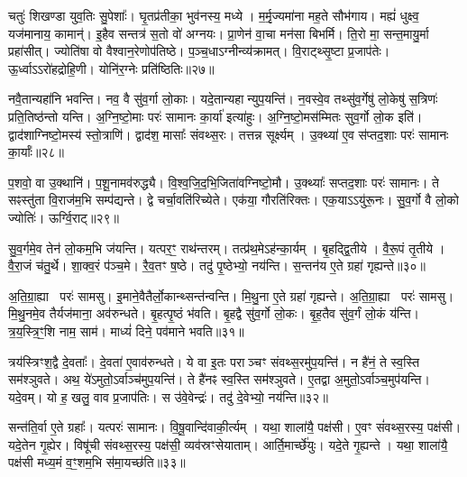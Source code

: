 चतुः॑ शिखण्डा युव॒तिः सु॒पेशाः᳚।
घृ॒तप्र॑तीका॒ भुव॑नस्य॒ मध्ये।
म॒र्मृ॒ज्यमा॑ना मह॒ते सौभ॑गाय।
मह्यं॑ धुक्ष्व॒ यज॑मानाय॒ कामान्॑।
इ॒हैव सन्तत्र॑ स॒तो वो॑ अग्नयः।
प्रा॒णेन॑ वा॒चा मन॑सा बिभर्मि।
ति॒रो मा॒ सन्त॒मायु॒र्मा प्रहा॑सीत्।
ज्योति॑षा वो वैश्वान॒रेणोप॑तिष्ठे।
प॒ञ्च॒धा\-ऽग्नीन्व्य॑क्रामत्।
वि॒राट्थ्सृ॒ष्टा प्र॒जाप॑तेः।
ऊ॒र्ध्वा\-ऽऽरो॑हद्रोहि॒णी।
योनि॑र॒ग्नेः प्रति॑ष्ठितिः॥२७॥\anuvakamend[वि॒श॒न्तु॒ नः॒ पु॒रू॒चीर्वि॑धेम नि॒धाय॒ यत्ते\-ऽप्र॑दाहाय बृह॒त्यो ब्रह्म॑णा दुवस्यत वि॒श्ववा॑र इ॒ममृ॑ञ्जते पुरो॒गां प्रज॑नयि॒ष्यथो॑ जनि॒ष्यते\-ऽस्मै॒ मम॑ महि॒म्ना वर्च॑से॒ दध॑थ्सुव॒र्गो भा॑हि सम्बभू॒वतु॒रायु॒र्व्या॑नशे॒ चतु॑ष्पदः स॒तां प्र॒जाप॑ते॒र्द्वे च॑]

नवै॒तान्यहा॑नि भवन्ति।
नव॒ वै सु॑व॒र्गा लो॒काः।
यदे॒तान्यहान्युप॒यन्ति॑।
न॒वस्वे॒व तथ्सु॑व॒र्गेषु॑ लो॒केषु॑ स॒त्रिणः॑ प्रति॒तिष्ठ॑न्तो यन्ति।
अ॒ग्नि॒ष्टो॒माः परः॑ सामानः का॒र्या॑ इत्या॑हुः।
अ॒ग्नि॒ष्टो॒मस॑म्मितः सुव॒र्गो लो॒क इति॑।
द्वाद॑शाग्निष्टो॒मस्य॑ स्तो॒त्राणि॑।
द्वाद॑श॒ मासाः᳚ संवथ्स॒रः।
तत्तन्न सूर्क्ष्यम्।
उ॒क्थ्या॑ ए॒व स॑प्तद॒शाः परः॑ सामानः का॒र्याः᳚॥२८॥

प॒शवो॒ वा उ॒क्थानि॑।
प॒शू॒नामव॑रुद्ध्यै।
वि॒श्व॒जि॒द॒भि॒जिता॑\-वग्निष्टो॒मौ।
उ॒क्थ्याः᳚ सप्तद॒शाः परः॑ सामानः।
ते सꣴस्तु॑ता वि॒राज॑म॒भि सम्प॑द्यन्ते।
द्वे चर्चा॒वति॑रिच्येते।
एक॑या॒ गौरति॑रिक्तः।
एक॒या\-ऽऽयु॑रू॒नः।
सु॒व॒र्गो वै लो॒को ज्योतिः॑।
ऊर्ग्वि॒राट्॥२९॥

सु॒व॒र्गमे॒व तेन॑ लो॒कम॒भि ज॑यन्ति।
यत्पर॒ꣳ॒ राथ॑न्तरम्।
तत्प्र॑थ॒मे\-ऽह॑न्का॒र्यम्।
बृ॒हद्द्वि॒तीये।
वै॒रू॒पं तृ॒तीये।
वै॒रा॒जं च॑तु॒र्थे।
शा॒क्व॒रं प॑ञ्च॒मे।
रै॒व॒तꣳ ष॒ष्ठे।
तदु॑ पृ॒ष्ठेभ्यो॒ नय॑न्ति।
स॒न्तन॑य ए॒ते ग्रहा॑ गृह्यन्ते॥३०॥

अ॒ति॒ग्रा॒ह्या परः॑ सामसु।
इ॒माने॒वैतैर्लो॒कान्थ्सन्त॑न्वन्ति।
मि॒थु॒ना ए॒ते ग्रहा॑ गृह्यन्ते।
अ॒ति॒ग्रा॒ह्या परः॑ सामसु।
मि॒थु॒नमे॒व तैर्यज॑माना॒ अव॑रुन्धते।
बृ॒हत्पृ॒ष्ठं भ॑वति।
बृ॒हद्वै सु॑व॒र्गो लो॒कः।
बृ॒ह॒तैव सु॑व॒र्गं लो॒कं य॑न्ति।
त्र॒य॒स्त्रि॒ꣳ॒शि  नाम॒ साम॑।
माध्यं॑ दिने॒ पव॑माने भवति॥३१॥

त्रय॑स्त्रिꣳश॒द्वै दे॒वताः᳚।
दे॒वता॑ ए॒वाव॑रुन्धते।
ये वा इ॒तः पराञ्चꣳ संवथ्स॒रमु॑प॒यन्ति॑।
न है॑नं॒ ते स्व॒स्ति सम॑श्ञुवते।
अथ॒ ये॑\-ऽमुतो॒\-ऽर्वाञ्च॑मुप॒यन्ति॑।
ते है॑नꣴ स्व॒स्ति सम॑श्ञुवते।
ए॒तद्वा अ॒मुतो॒\-ऽर्वाञ्च॒मुप॑यन्ति।
यदे॒वम्।
यो ह॒ खलु॒ वाव प्र॒जाप॑तिः।
स उ॑वे॒वेन्द्रः॑।
तदु॑ दे॒वेभ्यो॒ नय॑न्ति॥३२॥\anuvakamend[का॒र्या॑ वि॒राड्गृ॑ह्यन्ते॒ पव॑माने भव॒तीन्द्र॒ एकं॑ च]

सन्त॑ति॒र्वा ए॒ते ग्रहाः᳚।
यत्परः॑ सामानः।
वि॒षू॒वान्दि॑वा\-की॒र्त्यम्।
यथा॒ शाला॑यै॒ पक्ष॑सी।
ए॒वꣳ सं॑वथ्स॒रस्य॒ पक्ष॑सी।
यदे॒तेन गृ॒ह्येर\sn{}।
विषू॑ची संवथ्स॒रस्य॒ पक्ष॑सी॒ व्यव॑स्रꣳसेयाताम्।
आर्ति॒मार्च्छे॑युः।
यदे॒ते गृ॒ह्यन्ते।
यथा॒ शाला॑यै॒ पक्ष॑सी मध्य॒मं व॒ꣳ॒शम॒भि स॑मा॒यच्छ॑ति॥३३॥

